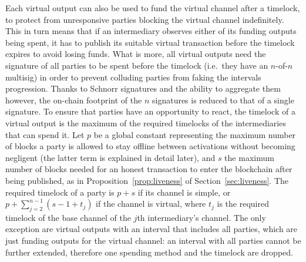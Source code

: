   Each virtual output can also be used to fund the virtual
  channel after a timelock, to protect from unresponsive parties blocking the
  virtual channel indefinitely. This in turn means that if an intermediary
  observes either of its funding outputs being spent, it has to publish its
  suitable virtual transaction before the timelock expires to avoid losing
  funds. What is more, all virtual outputs need the signature of all parties to
  be spent before the timelock (i.e.\ they have an $n$-of-$n$ multisig) in order
  to prevent colluding parties from faking the intervals progression. Thanks to
  Schnorr signatures and the ability to aggregate
  them~\cite{DBLP:journals/dcc/MaxwellPSW19,DBLP:conf/crypto/NickRS21} however,
  the on-chain footprint of
  the $n$ signatures is reduced to that of a single signature. To ensure
  that parties have an opportunity to react, the timelock of a virtual output is
  the maximum of the required timelocks of the intermediaries that can spend it.
  Let $p$ be a global constant representing the maximum number of blocks a party
  is allowed to stay offline between activations without becoming negligent
  (the latter term is explained in detail later), and
  $s$ the maximum number of blocks needed for an honest transaction to enter the
  blockchain after being published, as in Proposition~\ref{prop:liveness} of
  Section~\ref{sec:liveness}.
  The required timelock of a party is $p + s$ if its channel is simple,  or $p +
  \sum\limits_{j = 2}^{n - 1}(s - 1 + t_j)$ if the channel is virtual, where
  $t_j$ is the required timelock of the base channel
  of the $j$th intermediary's channel. The only exception are virtual outputs
  with an interval that includes all parties, which are just
  funding outputs for the virtual channel: an interval with all parties cannot
  be further extended, therefore one spending method and the timelock are
  dropped.

